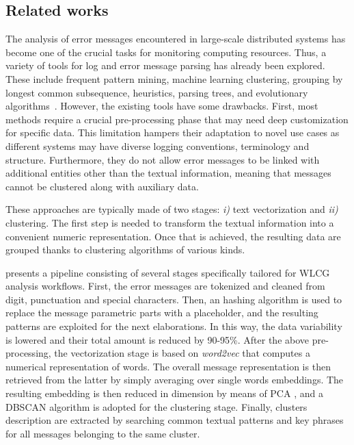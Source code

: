 \subsection{Related works}


The analysis of error messages encountered in large-scale distributed systems has become one of the crucial tasks for monitoring computing resources. 
Thus, a variety of tools for log and error message parsing has already been explored. 
These include frequent pattern mining, machine learning clustering, grouping by longest common subsequence, heuristics, parsing trees, and evolutionary algorithms~\cite{zhu2019tools}.
However, the existing tools have some drawbacks. First, most methods require a crucial pre-processing phase that may need deep customization for specific data. This limitation hampers their adaptation to novel use cases as different systems may have diverse logging conventions, terminology and structure.
Furthermore, they do not allow error messages to be linked with additional entities other than the textual information, meaning that messages cannot be clustered along with auxiliary data.

These approaches are typically made of two stages: \textit{i)} text vectorization and \textit{ii)} clustering.
The first step is needed to transform the textual information into a convenient numeric representation.
Once that is achieved, the resulting data are grouped thanks to clustering algorithms of various kinds. 

 presents a pipeline consisting of several stages specifically tailored for WLCG analysis workflows. 
First, the error messages are tokenized and cleaned from digit, punctuation and special characters.
Then, an hashing algorithm is used to replace the message parametric parts with a placeholder, and the resulting patterns are exploited for the next elaborations. In this way, the data variability is lowered and their total amount is reduced by 90-95\%.
After the above pre-processing, the vectorization stage is based on \textit{word2vec} \cite{word2vec} that computes a numerical representation of words. The overall message representation is then retrieved from the latter by simply averaging over single words embeddings. 
The resulting embedding is then reduced in dimension by means of PCA \cite{pca}, and a DBSCAN \cite{dbscan} algorithm is adopted for the clustering stage.
Finally, clusters description are extracted by searching common textual patterns and key phrases for all messages belonging to the same cluster.

